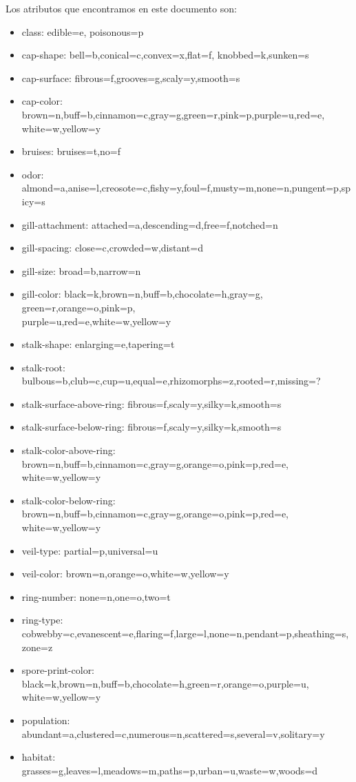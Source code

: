 \documentclass [a4paper] {article}
\begin{document}
\bigskip
Los atributos que encontramos en este documento son:
\begin{itemize}
\item class: edible=e, poisonous=p
\item cap-shape: bell=b,conical=c,convex=x,flat=f, knobbed=k,sunken=s
\item cap-surface: fibrous=f,grooves=g,scaly=y,smooth=s
\item cap-color: brown=n,buff=b,cinnamon=c,gray=g,green=r,pink=p,purple=u,red=e,\\white=w,yellow=y
\item bruises: bruises=t,no=f
\item odor: almond=a,anise=l,creosote=c,fishy=y,foul=f,musty=m,none=n,pungent=p,spicy=s
\item gill-attachment: attached=a,descending=d,free=f,notched=n
\item gill-spacing: close=c,crowded=w,distant=d
\item gill-size: broad=b,narrow=n
\item gill-color: black=k,brown=n,buff=b,chocolate=h,gray=g, green=r,orange=o,pink=p,\\purple=u,red=e,white=w,yellow=y
\item stalk-shape: enlarging=e,tapering=t
\item stalk-root: bulbous=b,club=c,cup=u,equal=e,rhizomorphs=z,rooted=r,missing=?
\item stalk-surface-above-ring: fibrous=f,scaly=y,silky=k,smooth=s
\item stalk-surface-below-ring: fibrous=f,scaly=y,silky=k,smooth=s
\item stalk-color-above-ring: brown=n,buff=b,cinnamon=c,gray=g,orange=o,pink=p,red=e,\\white=w,yellow=y
\item stalk-color-below-ring: brown=n,buff=b,cinnamon=c,gray=g,orange=o,pink=p,red=e,\\white=w,yellow=y
\item veil-type: partial=p,universal=u
\item veil-color: brown=n,orange=o,white=w,yellow=y
\item ring-number: none=n,one=o,two=t
\item ring-type: cobwebby=c,evanescent=e,flaring=f,large=l,none=n,pendant=p,sheathing=s,zone=z
\item spore-print-color: black=k,brown=n,buff=b,chocolate=h,green=r,orange=o,purple=u,\\white=w,yellow=y
\item population: abundant=a,clustered=c,numerous=n,scattered=s,several=v,solitary=y
\item habitat: grasses=g,leaves=l,meadows=m,paths=p,urban=u,waste=w,woods=d
\end{itemize}
\end{document}
